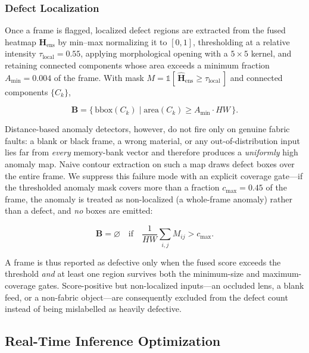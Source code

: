 \documentclass[journal]{IEEEtran}
\begin{document}
\subsubsection{Defect Localization}

Once a frame is flagged, localized defect regions are extracted from the fused heatmap $\mathbf{H}_{\text{ens}}$ by min--max normalizing it to $[0,1]$, thresholding at a relative intensity $\tau_{\text{local}} = 0.55$, applying morphological opening with a $5\times5$ kernel, and retaining connected components whose area exceeds a minimum fraction $A_{\min} = 0.004$ of the frame. With mask $M = \mathbb{1}[\,\hat{\mathbf{H}}_{\text{ens}} \geq \tau_{\text{local}}\,]$ and connected components $\{C_k\}$,

\begin{equation}
    \mathbf{B} = \{\, \text{bbox}(C_k) \;|\; \text{area}(C_k) \geq A_{\min}\!\cdot\! HW \,\}.
    \label{eq:bboxes}
\end{equation}

Distance-based anomaly detectors, however, do not fire only on genuine fabric faults: a blank or black frame, a wrong material, or any out-of-distribution input lies far from \emph{every} memory-bank vector and therefore produces a \emph{uniformly} high anomaly map. Naive contour extraction on such a map draws defect boxes over the entire frame. We suppress this failure mode with an explicit coverage gate---if the thresholded anomaly mask covers more than a fraction $c_{\max} = 0.45$ of the frame, the anomaly is treated as non-localized (a whole-frame anomaly) rather than a defect, and \emph{no} boxes are emitted:

\begin{equation}
    \mathbf{B} = \varnothing \quad\text{if}\quad \frac{1}{HW}\sum_{i,j} M_{ij} > c_{\max}.
    \label{eq:coverage}
\end{equation}

A frame is thus reported as defective only when the fused score exceeds the threshold \emph{and} at least one region survives both the minimum-size and maximum-coverage gates. Score-positive but non-localized inputs---an occluded lens, a blank feed, or a non-fabric object---are consequently excluded from the defect count instead of being mislabelled as heavily defective.

\subsection{Real-Time Inference Optimization}
\end{document}
